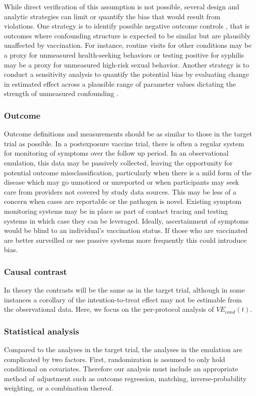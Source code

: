 \documentclass[11pt]{article}
\begin{document}
While direct verification of this assumption is not possible, several design and analytic strategies can limit or quantify the bias that would result from violations. One strategy is to identify possible negative outcome controls \cite{chua_use_2020,lipsitch_negative_2010-1}, that is outcomes where confounding structure is expected to be similar but are plausibly unaffected by vaccination. For instance, routine visits for other conditions may be a proxy for unmeasured health-seeking behaviors or testing positive for syphilis may be a proxy for unmeasured high-risk sexual behavior.  Another strategy is to conduct a sensitivity analysis to quantify the potential bias by evaluating change in estimated effect across a plausible range of parameter values dictating the strength of unmeasured confounding \cite{robins_sensitivity_2000}. 

\subsubsection*{Outcome}
Outcome definitions and measurements should be as similar to those in the target trial as possible. In a postexposure vaccine trial, there is often a regular system for monitoring of symptoms over the follow up period. In an observational emulation, this data may be passively collected, leaving the opportunity for potential outcome missclassification, particularly when there is a mild form of the disease which may go unnoticed or unreported or when participants may seek care from providers not covered by study data sources. This may be less of a concern when cases are reportable or the pathogen is novel. Existing symptom monitoring systems may be in place as part of contact tracing and testing systems in which case they can be leveraged. Ideally, ascertainment of symptoms would be blind to an individual's vaccination status. If those who are vaccinated are better surveilled or use passive systems more frequently this could introduce bias. 

\subsubsection*{Causal contrast}
In theory the contrasts will be the same as in the target trial, although in some instances a corollary of the intention-to-treat effect may not be estimable from the observational data. Here, we focus on the per-protocol \cite{hernan_per-protocol_2017} analysis of $VE_{cond}(t)$.

\subsubsection*{Statistical analysis}
Compared to the analyses in the target trial, the analyses in the emulation are complicated by two factors. First, randomization is assumed to only hold conditional on covariates. Therefore our analysis must include an appropriate method of adjustment such as outcome regression, matching, inverse-probability weighting, or a combination thereof. 
\end{document}
